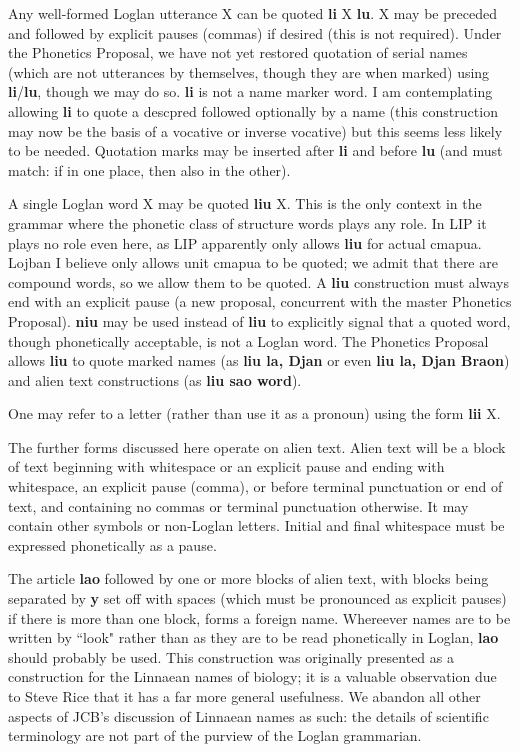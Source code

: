 \documentclass[12pt]{book}
\begin{document}
{Any well-formed Loglan utterance X can be quoted {\bf li} X {\bf lu}.  X may be preceded and followed by explicit pauses (commas) if desired (this is not required).  Under the Phonetics Proposal, we have not yet restored quotation of serial names (which are not utterances by themselves, though they are when marked) using {\bf li}/{\bf lu}, though we may do so.  {\bf li} is not a name marker word.
I am contemplating allowing {\bf li} to quote a descpred followed optionally by a name (this construction may now be the basis of a vocative or inverse vocative) but this seems less likely to be needed.  Quotation marks may be inserted after {\bf li} and before {\bf lu} (and must match:  if in one place, then also in the other).

A single Loglan word X may be quoted {\bf liu} X.   This is the only context in the grammar where the phonetic class of structure words plays any role.  In LIP it plays no role even here,
as LIP apparently only allows {\bf liu} for actual cmapua.   Lojban I believe only allows unit cmapua to be quoted; we admit that there are compound words,
so we allow them to be quoted.   A {\bf liu} construction must always end with an explicit pause (a new proposal, concurrent with the master Phonetics Proposal).   {\bf niu} may be used instead of {\bf liu}
to explicitly signal that a quoted word, though phonetically acceptable, is not a Loglan word.   The Phonetics Proposal allows {\bf liu} to quote
marked names (as {\bf liu la, Djan} or even {\bf liu la, Djan Braon}) and alien text constructions (as {\bf liu sao word}).

One may refer to a letter (rather than use it as a pronoun) using the form {\bf lii} X.



The further forms discussed here operate on alien text.   Alien text will be a block of text beginning with whitespace or an explicit pause and ending with whitespace, an explicit pause (comma), or before terminal punctuation or end of text,  and containing no commas or terminal punctuation otherwise.
It may contain other symbols or non-Loglan letters.  Initial and final whitespace must be expressed phonetically as a pause.

The article {\bf lao} followed by one or more blocks of alien text, with blocks being separated by {\bf y} set off with spaces (which must be pronounced as explicit pauses) if there is more than one block, forms a foreign name.
Whereever names are to be written by ``look" rather than as they are to be read phonetically in Loglan, {\bf lao} should probably be used.   This construction was originally presented as a construction for the Linnaean names of biology; it is a valuable observation due to Steve Rice that it has a far more general usefulness.  We abandon all other aspects of JCB's discussion of Linnaean names as such:  the details of scientific terminology are not part of the purview of the Loglan grammarian.

}
\end{document}
